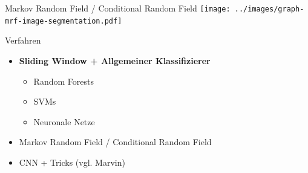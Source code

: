 \begin{frame}{Markov Random Field / Conditional Random Field}
    \texttt{[image: ../images/graph-mrf-image-segmentation.pdf]}
\end{frame}

\begin{frame}{Verfahren}
    \begin{itemize}
        \item \textbf{Sliding Window + Allgemeiner Klassifizierer}
        \begin{itemize}
            \item Random Forests
            \item SVMs
            \item Neuronale Netze
        \end{itemize}
        \item Markov Random Field / Conditional Random Field
        \item CNN + Tricks (vgl. Marvin)
    \end{itemize}
\end{frame}
